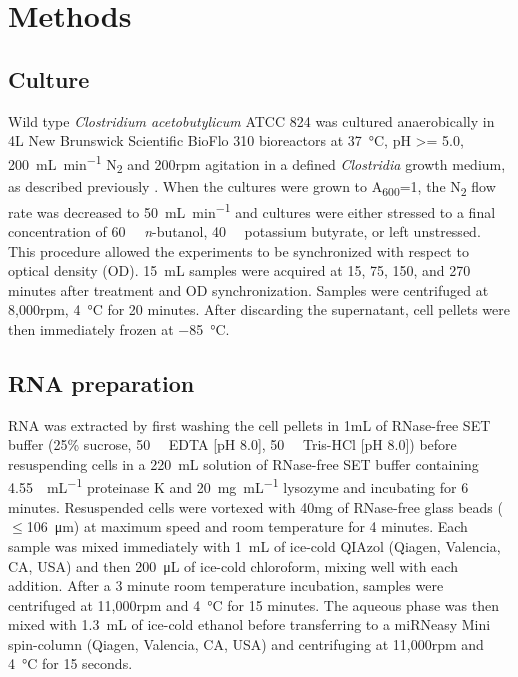 
\chapter{Methods}

\section{Culture}
Wild type \textit{Clostridium acetobutylicum} ATCC 824 was cultured anaerobically in 4L New Brunswick Scientific BioFlo 310 bioreactors at \SI{37}{\degreeCelsius}, pH >= 5.0, \SI{200}{\milli\liter\per\minute} N\textsubscript{2} and 200rpm agitation in a defined \textit{Clostridia} growth medium, as described previously \cite{39}. When the cultures were grown to A\textsubscript{600}=1, the N\textsubscript{2} flow rate was decreased to \SI{50}{\milli\liter\per\minute} and cultures were either stressed to a final concentration of \SI{60}{\milli\Molar} \textit{n}-butanol, \SI{40}{\milli\Molar} potassium butyrate, or left unstressed. This procedure allowed the experiments to be synchronized with respect to optical density (OD). \SI{15}{\milli\liter} samples were acquired at 15, 75, 150, and 270 minutes after treatment and OD synchronization. Samples were centrifuged at 8,000rpm, \SI{4}{\degreeCelsius} for 20 minutes. After discarding the supernatant, cell pellets were then immediately frozen at \SI{-85}{\degreeCelsius}.

\section{RNA preparation}
\label{methods:RNA_prep}
RNA was extracted by first washing the cell pellets in 1mL of RNase-free SET buffer (25\% sucrose, \SI{50}{\milli\Molar} EDTA [pH 8.0], \SI{50}{\milli\Molar} Tris-HCl [pH 8.0]) before resuspending cells in a \SI{220}{\milli\liter} solution of RNase-free SET buffer containing \SI{4.55}{\Units\per\milli\liter} proteinase K and \SI{20}{\milli\gram\per\milli\liter} lysozyme and incubating for 6 minutes. Resuspended cells were vortexed with 40mg of RNase-free glass beads ($\leq$\SI{106}{\micro\metre}) at maximum speed and room temperature for 4 minutes. Each sample was mixed immediately with \SI{1}{\milli\liter} of ice-cold QIAzol (Qiagen, Valencia, CA, USA) and then \SI{200}{\micro\liter} of ice-cold chloroform, mixing well with each addition. After a 3 minute room temperature incubation, samples were centrifuged at 11,000rpm and \SI{4}{\degreeCelsius} for 15 minutes. The aqueous phase was then mixed with \SI{1.3}{\milli\liter} of ice-cold ethanol before transferring to a miRNeasy Mini spin-column (Qiagen, Valencia, CA, USA) and centrifuging at 11,000rpm and \SI{4}{\degreeCelsius} for 15 seconds.

